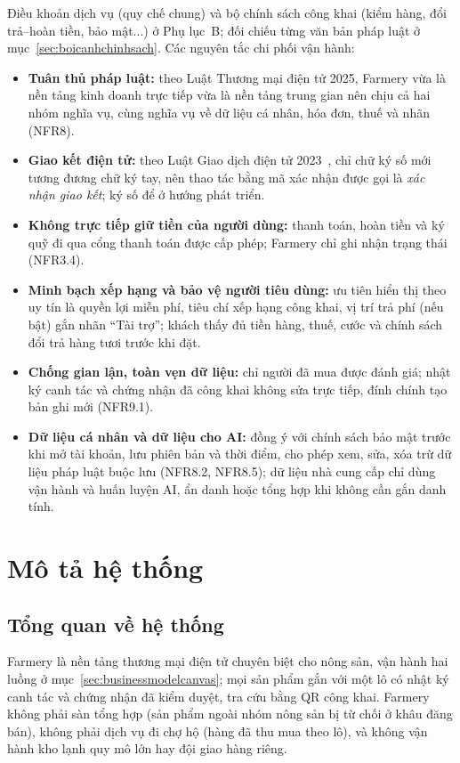 Điều khoản dịch vụ (quy chế chung) và bộ chính sách công khai (kiểm hàng, đổi trả--hoàn tiền, bảo mật...) ở Phụ lục~B; đối chiếu từng văn bản pháp luật ở mục~\ref{sec:boicanhchinhsach}. Các nguyên tắc chi phối vận hành:
\begin{itemize}
    \item \textbf{Tuân thủ pháp luật:} theo Luật Thương mại điện tử 2025, Farmery vừa là nền tảng kinh doanh trực tiếp vừa là nền tảng trung gian nên chịu cả hai nhóm nghĩa vụ, cùng nghĩa vụ về dữ liệu cá nhân, hóa đơn, thuế và nhãn (NFR8).
    \item \textbf{Giao kết điện tử:} theo Luật Giao dịch điện tử 2023~\cite{luatgddt2023}, chỉ chữ ký số mới tương đương chữ ký tay, nên thao tác bằng mã xác nhận được gọi là \emph{xác nhận giao kết}; ký số để ở hướng phát triển.
    \item \textbf{Không trực tiếp giữ tiền của người dùng:} thanh toán, hoàn tiền và ký quỹ đi qua cổng thanh toán được cấp phép; Farmery chỉ ghi nhận trạng thái (NFR3.4).
    \item \textbf{Minh bạch xếp hạng và bảo vệ người tiêu dùng:} ưu tiên hiển thị theo uy tín là quyền lợi miễn phí, tiêu chí xếp hạng công khai, vị trí trả phí (nếu bật) gắn nhãn ``Tài trợ''; khách thấy đủ tiền hàng, thuế, cước và chính sách đổi trả hàng tươi trước khi đặt.
    \item \textbf{Chống gian lận, toàn vẹn dữ liệu:} chỉ người đã mua được đánh giá; nhật ký canh tác và chứng nhận đã công khai không sửa trực tiếp, đính chính tạo bản ghi mới (NFR9.1).
    \item \textbf{Dữ liệu cá nhân và dữ liệu cho AI:} đồng ý với chính sách bảo mật trước khi mở tài khoản, lưu phiên bản và thời điểm, cho phép xem, sửa, xóa trừ dữ liệu pháp luật buộc lưu (NFR8.2, NFR8.5); dữ liệu nhà cung cấp chỉ dùng vận hành và huấn luyện AI, ẩn danh hoặc tổng hợp khi không cần gắn danh tính.
\end{itemize}

\section{Mô tả hệ thống}
\label{sec:motahethong}

\subsection{Tổng quan về hệ thống}
\label{sec:luongvanhanh}

Farmery là nền tảng thương mại điện tử chuyên biệt cho nông sản, vận hành hai luồng ở mục~\ref{sec:businessmodelcanvas}; mọi sản phẩm gắn với một lô có nhật ký canh tác và chứng nhận đã kiểm duyệt, tra cứu bằng QR công khai. Farmery không phải sàn tổng hợp (sản phẩm ngoài nhóm nông sản bị từ chối ở khâu đăng bán), không phải dịch vụ đi chợ hộ (hàng đã thu mua theo lô), và không vận hành kho lạnh quy mô lớn hay đội giao hàng riêng.

